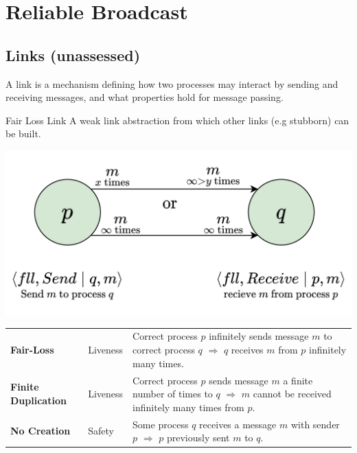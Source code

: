 \chapter{Reliable Broadcast}

\section{Links (unassessed)}
A link is a mechanism defining how two processes may interact by sending and receiving messages, and what properties hold for message passing.

\begin{definitionbox}{Fair Loss Link}
    A weak link abstraction from which other links (e.g stubborn) can be built.
    \begin{center}
        \includegraphics[width=.6\textwidth]{reliable_broadcast/images/fair_loss_links.drawio.png}
    \end{center}
    \begin{tabular}{l l p{}}
        \textbf{Fair-Loss} & Liveness & Correct process $p$ infinitely sends message $m$ to correct process $q$ $\Rightarrow$ $q$ receives $m$ from $p$ infinitely many times. \\
        \textbf{Finite Duplication} & Liveness & Correct process $p$ sends message $m$ a finite number of times to $q$ $\Rightarrow$ $m$ cannot be received infinitely many times from $p$. \\
        \textbf{No Creation} & Safety & Some process $q$ receives a message $m$ with sender $p$ $\Rightarrow$ $p$ previously sent $m$ to $q$. \\
    \end{tabular}
\end{definitionbox}
